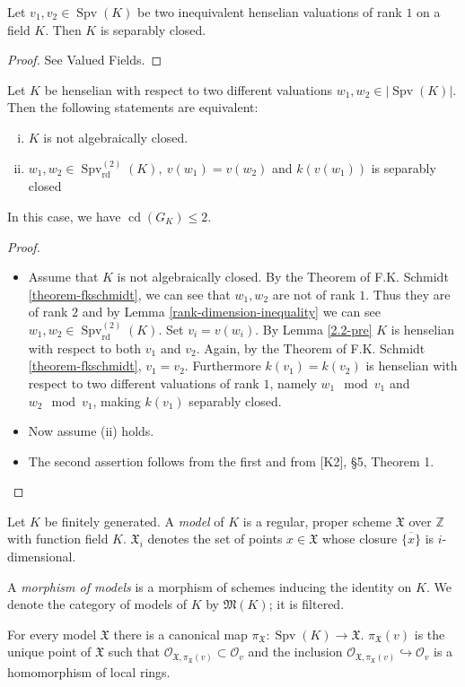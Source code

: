 \begin{theorem}\label{theorem-fkschmidt}
Let $v_1,v_2\in\operatorname{Spv}(K)$ be two inequivalent henselian valuations of rank $1$ on a field $K$. Then $K$ is separably closed.
\end{theorem}

\begin{proof}
See Valued Fields.
\end{proof}

\begin{lemma}\label{2.2}
Let $K$ be henselian with respect to two different valuations $w_1,w_2\in |\operatorname{Spv}(K)|$. Then the following statements are equivalent: 
\begin{enumerate}[(i)]
\item $K$ is not algebraically closed.
\item $w_1,w_2\in\operatorname{Spv}_\text{rd}^{(2)}(K),\ v(w_1)=v(w_2)$ and $k(v(w_1))$ is separably closed
\end{enumerate}
In this case, we have $\operatorname{cd}(G_K)\leq 2$.
\end{lemma}

\begin{proof}
\begin{itemize}
\item Assume that $K$ is not algebraically closed. By the Theorem of F.K. Schmidt \ref{theorem-fkschmidt}, we can see that $w_1,w_2$ are not of rank $1$. Thus they are of rank $2$ and by Lemma \ref{rank-dimension-inequality} we can see $w_1,w_2\in\operatorname{Spv}_\text{rd}^{(2)}(K)$. Set $v_i=v(w_i)$. By Lemma \ref{2.2-pre} $K$ is henselian with respect to both $v_1$ and $v_2$. Again, by the Theorem of F.K. Schmidt \ref{theorem-fkschmidt}, $v_1 = v_2$. Furthermore $k(v_1) = k(v_2)$ is henselian with respect to two different valuations of rank $1$, namely $w_1\mod v_1$ and $w_2\mod v_1$, making $k(v_1)$ separably closed.
\item Now assume (ii) holds.
\item The second assertion follows from the first and from [K2], §5, Theorem 1.\qedhere
\end{itemize}
\end{proof}

\begin{definition}
Let $K$ be finitely generated. A \textit{model} of $K$ is a regular, proper scheme $\mathfrak{X}$ over $\mathbb{Z}$ with function field $K$. $\mathfrak{X}_i$ denotes the set of points $x\in\mathfrak{X}$ whose closure $\overline{\{x\}}$ is $i$-dimensional.

A \textit{morphism of models} is a morphism of schemes inducing the identity on $K$. We denote the category of models of $K$ by $\mathfrak{M}(K)$; it is filtered. 

For every model $\mathfrak{X}$ there is a canonical map $\pi_\mathfrak{X}:\operatorname{Spv}(K)\to\mathfrak{X}$. $\pi_\mathfrak{X}(v)$  is the unique point of $\mathfrak{X}$ such that $\mathcal{O}_{\mathfrak{X}, \pi_\mathfrak{X}(v)}\subset\mathcal{O}_v$ and the inclusion $\mathcal{O}_{\mathfrak{X}, \pi_\mathfrak{X}(v)}\hookrightarrow \mathcal{O}_v$ is a homomorphism of local rings.
\end{definition}

